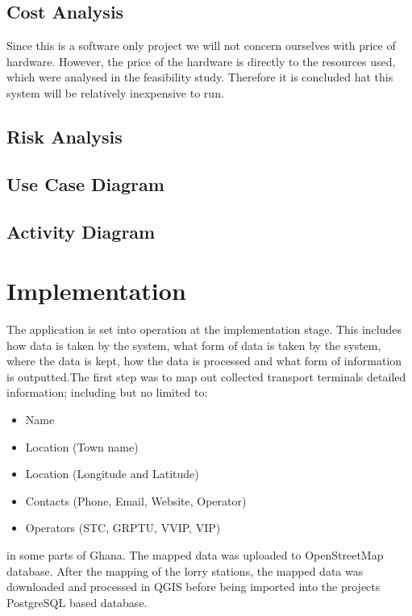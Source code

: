 \subsection{Cost Analysis}
Since this is a software only project we will not concern ourselves with price of hardware.  However, the price of the hardware is directly to the resources used, which were analysed in the feasibility study. Therefore it is concluded hat this system will be relatively inexpensive to run.

\subsection{Risk Analysis}

\subsection{Use Case Diagram}

\subsection{Activity Diagram}

\section{Implementation}
The application is set into operation at the implementation stage. This includes how data is taken by the system, what form of data is taken by the system, where the data is kept, how the data is processed and what form of information is outputted.The first step was to map out collected transport terminals detailed information; including but no limited to:
\begin{itemize}
	\item Name
	\item Location (Town name)
	\item Location (Longitude and Latitude)
	\item Contacts (Phone, Email, Website, Operator)
	\item Operators (STC, GRPTU, VVIP, VIP)
\end{itemize}

in some parts of Ghana. The mapped data was uploaded to OpenStreetMap database. After the mapping of the lorry stations, the mapped data was downloaded and processed in QGIS before being imported into the projects PostgreSQL based database.

